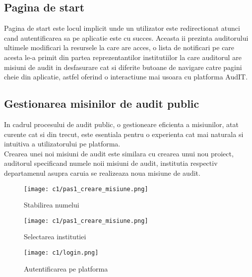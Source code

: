 \subsection{Pagina de start}
Pagina de start este locul implicit unde un utilizator este redirectionat atunci cand autentificarea sa pe aplicatie este cu succes. Aceasta ii prezinta auditorului ultimele modificari la resursele la care are acces, o lista de notificari pe care acesta le-a primit din partea reprezentantilor institutiilor la care auditorul are misiuni de audit in desfasurare cat si diferite butoane de navigare catre pagini cheie din aplicatie, astfel oferind o interactiune mai usoara cu platforma AudIT.

\subsection{Gestionarea misinilor de audit public}
In cadrul procesului de audit public, o gestioneare eficienta a misiunilor, atat curente cat si din trecut, este esentiala pentru o experienta cat mai naturala si intuitiva a utilizatorului pe platforma.\\
Crearea unei noi misiuni de audit este similara cu crearea unui nou proiect, auditorul specificand numele noii misiuni de audit, institutia respectiv departamenul asupra caruia se realizeaza noua misiune de audit.

	\vspace{0.5 cm}
\begin{figure}[h]
	\centering
	\begin{minipage}{.5\textwidth}
		\centering
		\texttt{[image: c1/pas1\_creare\_misiune.png]}
		\caption{Stabilirea numelui}
		
	\end{minipage}%
	\begin{minipage}{.5\textwidth}
		\centering
		\texttt{[image: c1/pas1\_creare\_misiune.png]}
		\caption{Selectarea institutiei}
	
	\end{minipage}
	\vspace{0.5 cm}

	\centering
	
	\texttt{[image: c1/login.png]}
	\caption{Autentificarea pe platforma}

\end{figure}


